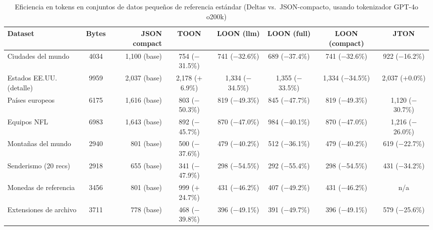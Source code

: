 \begin{table}[htbp]
  \centering
  \caption{Eficiencia en tokens en conjuntos de datos pequeños de referencia estándar (Deltas vs.\ JSON-compacto, usando tokenizador GPT-4o o200k)}
  \label{tab:tokens-real-small}
  \tiny
  \setlength{\tabcolsep}{2pt}
  \begin{tabular}{@{}lcrccccc@{}}
    \toprule
    \textbf{Dataset} & \textbf{Bytes} & \textbf{JSON compact} & \textbf{TOON} & \textbf{LOON (llm)} & \textbf{LOON (full)} & \textbf{LOON (compact)} & \textbf{JTON} \\
    \midrule
    Ciudades del mundo & 4034 & 1,100 {\scriptsize (base)} & 754 {\scriptsize ($-$31.5\%)} & 741 {\scriptsize ($-$32.6\%)} & 689 {\scriptsize ($-$37.4\%)} & 741 {\scriptsize ($-$32.6\%)} & 922 {\scriptsize ($-$16.2\%)} \\
    Estados EE.UU. (detalle) & 9959 & 2,037 {\scriptsize (base)} & 2,178 {\scriptsize ($+$6.9\%)} & 1,334 {\scriptsize ($-$34.5\%)} & 1,355 {\scriptsize ($-$33.5\%)} & 1,334 {\scriptsize ($-$34.5\%)} & 2,037 {\scriptsize ($+$0.0\%)} \\
    Países europeos & 6175 & 1,616 {\scriptsize (base)} & 803 {\scriptsize ($-$50.3\%)} & 819 {\scriptsize ($-$49.3\%)} & 845 {\scriptsize ($-$47.7\%)} & 819 {\scriptsize ($-$49.3\%)} & 1,120 {\scriptsize ($-$30.7\%)} \\
    Equipos NFL & 6983 & 1,643 {\scriptsize (base)} & 892 {\scriptsize ($-$45.7\%)} & 870 {\scriptsize ($-$47.0\%)} & 984 {\scriptsize ($-$40.1\%)} & 870 {\scriptsize ($-$47.0\%)} & 1,216 {\scriptsize ($-$26.0\%)} \\
    Montañas del mundo & 2940 & 801 {\scriptsize (base)} & 500 {\scriptsize ($-$37.6\%)} & 479 {\scriptsize ($-$40.2\%)} & 512 {\scriptsize ($-$36.1\%)} & 479 {\scriptsize ($-$40.2\%)} & 619 {\scriptsize ($-$22.7\%)} \\
    Senderismo (20 recs) & 2918 & 655 {\scriptsize (base)} & 341 {\scriptsize ($-$47.9\%)} & 298 {\scriptsize ($-$54.5\%)} & 292 {\scriptsize ($-$55.4\%)} & 298 {\scriptsize ($-$54.5\%)} & 431 {\scriptsize ($-$34.2\%)} \\
    Monedas de referencia & 3456 & 801 {\scriptsize (base)} & 999 {\scriptsize ($+$24.7\%)} & 431 {\scriptsize ($-$46.2\%)} & 407 {\scriptsize ($-$49.2\%)} & 431 {\scriptsize ($-$46.2\%)} & n/a \\
    Extensiones de archivo & 3711 & 778 {\scriptsize (base)} & 468 {\scriptsize ($-$39.8\%)} & 396 {\scriptsize ($-$49.1\%)} & 391 {\scriptsize ($-$49.7\%)} & 396 {\scriptsize ($-$49.1\%)} & 579 {\scriptsize ($-$25.6\%)} \\

\end{tabular}
\end{table}
